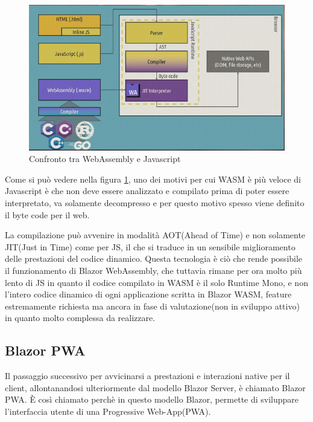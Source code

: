 \begin{figure}[H]
	\centerline{\includegraphics[scale=0.7]{figure/WasmVSJavascript.PNG}}
	\caption{Confronto tra WebAssembly e Javascript}
	\label{fig:WasmVSJavascript}
\end{figure}

Come si pu\`o vedere nella figura \ref{fig:WasmVSJavascript}, uno dei motivi per cui WASM \`e pi\`u veloce di Javascript \`e che non deve essere analizzato e compilato prima di poter essere interpretato, va solamente decompresso e per questo motivo spesso viene definito il byte code per il web.

La compilazione pu\`o avvenire in modalit\`a AOT(Ahead of Time) e non solamente JIT(Just in Time) come per JS, il che si traduce in un sensibile miglioramento delle prestazioni del codice dinamico.
Questa tecnologia \`e ci\`o che rende possibile il funzionamento di Blazor WebAssembly, che tuttavia rimane per ora molto pi\`u lento di JS in quanto il codice compilato in WASM \`e il solo Runtime Mono, e non l'intero codice dinamico di ogni applicazione scritta in Blazor WASM, feature estremamente richiesta ma ancora in fase di valutazione(non in sviluppo attivo) in quanto molto complessa da realizzare.

\subsection{Blazor PWA}\label{sez:bpwa}
Il passaggio successivo per avvicinarsi a prestazioni e interazioni native per il client, allontanandosi ulteriormente dal modello Blazor Server, \`e chiamato Blazor PWA.
\`E cos\`i chiamato perch\`e in questo modello Blazor, permette di sviluppare l'interfaccia utente di una Progressive Web-App(PWA).

